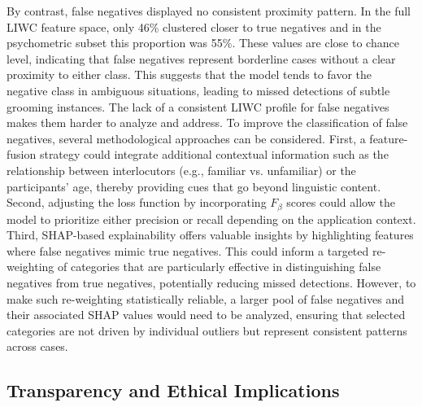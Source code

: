 By contrast, false negatives displayed no consistent proximity pattern. In the full LIWC feature space, only 46\% clustered closer to true negatives and in the psychometric subset this proportion was 55\%. These values are close to chance level, indicating that false negatives represent borderline cases without a clear proximity to either class. This suggests that the model tends to favor the negative class in ambiguous situations, leading to missed detections of subtle grooming instances. The lack of a consistent LIWC profile for false negatives makes them harder to analyze and address. To improve the classification of false negatives, several methodological approaches can be considered. First, a feature-fusion strategy could integrate additional contextual information such as the relationship between interlocutors (e.g., familiar vs. unfamiliar) or the participants’ age, thereby providing cues that go beyond linguistic content. Second, adjusting the loss function by incorporating $F_{\beta}$ scores could allow the model to prioritize either precision or recall depending on the application context. Third, SHAP-based explainability offers valuable insights by highlighting features where false negatives mimic true negatives. This could inform a targeted re-weighting of categories that are particularly effective in distinguishing false negatives from true negatives, potentially reducing missed detections.  However, to make such re-weighting statistically reliable, a larger pool of false negatives and their associated SHAP values would need to be analyzed, ensuring that selected categories are not driven by individual outliers but represent consistent patterns across cases.

\subsection{Transparency and Ethical Implications}

